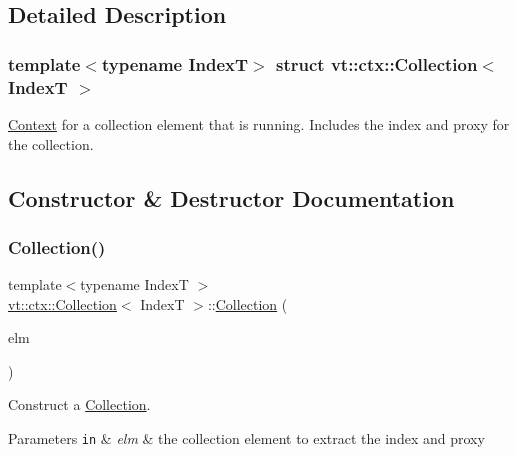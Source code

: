 \subsection{Detailed Description}
\subsubsection*{template$<$typename IndexT$>$\newline
struct vt\+::ctx\+::\+Collection$<$ Index\+T $>$}

\hyperlink{structvt_1_1ctx_1_1_context}{Context} for a collection element that is running. Includes the index and proxy for the collection. 

\subsection{Constructor \& Destructor Documentation}
\mbox{\label{structvt_1_1ctx_1_1_collection_ad845dcb56b8ba12adb1181bb0ea2ded5}} 
\subsubsection{\texorpdfstring{Collection()}{Collection()}}
{\footnotesize\ttfamily template$<$typename IndexT $>$ \\
\hyperlink{structvt_1_1ctx_1_1_collection}{vt\+::ctx\+::\+Collection}$<$ IndexT $>$\+::\hyperlink{structvt_1_1ctx_1_1_collection}{Collection} (\begin{DoxyParamCaption}\item[{\hyperlink{structvt_1_1vrt_1_1collection_1_1_indexable}{vrt\+::collection\+::\+Indexable}$<$ IndexT $>$ $\ast$}]{elm }\end{DoxyParamCaption})\hspace{0.3cm}{\ttfamily [explicit]}}



Construct a {\ttfamily \hyperlink{structvt_1_1ctx_1_1_collection}{Collection}}. 


\begin{DoxyParams}[1]{Parameters}
\mbox{\tt in}  & {\em elm} & the collection element to extract the index and proxy \\
\hline
\end{DoxyParams}


